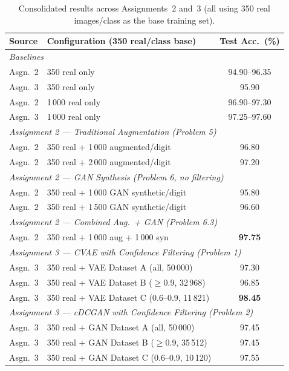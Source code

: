 \documentclass[12pt, a4paper]{article}
\renewcommand{\arraystretch}{1.12}
\begin{document}
\begin{table}[H]
\centering
\renewcommand{\arraystretch}{1.35}
\begin{tabular}{l l c}
\toprule
\textbf{Source} & \textbf{Configuration (350 real/class base)} & \textbf{Test Acc.\ (\%)} \\
\midrule
\multicolumn{3}{l}{\textit{Baselines}} \\
Asgn.\ 2 & 350 real only                                    & 94.90--96.35 \\
Asgn.\ 3 & 350 real only                                    & 95.90 \\
Asgn.\ 2 & 1\,000 real only                                 & 96.90--97.30 \\
Asgn.\ 3 & 1\,000 real only                                 & 97.25--97.60 \\
\midrule
\multicolumn{3}{l}{\textit{Assignment 2 --- Traditional Augmentation (Problem 5)}} \\
Asgn.\ 2 & 350 real + 1\,000 augmented/digit                & 96.80 \\
Asgn.\ 2 & 350 real + 2\,000 augmented/digit                & 97.20 \\
\midrule
\multicolumn{3}{l}{\textit{Assignment 2 --- GAN Synthesis (Problem 6, no filtering)}} \\
Asgn.\ 2 & 350 real + 1\,000 GAN synthetic/digit            & 95.80 \\
Asgn.\ 2 & 350 real + 1\,500 GAN synthetic/digit            & 96.60 \\
\midrule
\multicolumn{3}{l}{\textit{Assignment 2 --- Combined Aug.\ + GAN (Problem 6.3)}} \\
Asgn.\ 2 & 350 real + 1\,000 aug + 1\,000 syn               & \textbf{97.75} \\
\midrule
\multicolumn{3}{l}{\textit{Assignment 3 --- CVAE with Confidence Filtering (Problem 1)}} \\
Asgn.\ 3 & 350 real + VAE Dataset A (all, 50\,000)          & 97.30 \\
Asgn.\ 3 & 350 real + VAE Dataset B ($\geq$0.9, 32\,968)    & 96.85 \\
Asgn.\ 3 & 350 real + VAE Dataset C (0.6--0.9, 11\,821)     & \textbf{98.45} \\
\midrule
\multicolumn{3}{l}{\textit{Assignment 3 --- cDCGAN with Confidence Filtering (Problem 2)}} \\
Asgn.\ 3 & 350 real + GAN Dataset A (all, 50\,000)          & 97.45 \\
Asgn.\ 3 & 350 real + GAN Dataset B ($\geq$0.9, 35\,512)    & 97.45 \\
Asgn.\ 3 & 350 real + GAN Dataset C (0.6--0.9, 10\,120)     & 97.55 \\
\bottomrule
\end{tabular}
\caption{Consolidated results across Assignments~2 and~3 (all using 350 real images/class as the base training set).}
\label{tab:consolidated}
\end{table}
\end{document}
